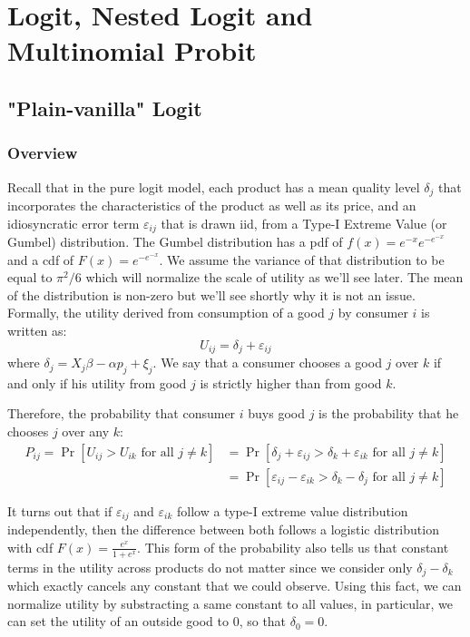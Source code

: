 \documentclass[12pt]{report}
\newcommand{\prob}[1]{\operatorname{Pr}\left[#1\right]}
\begin{document}
\chapter{Logit, Nested Logit and Multinomial Probit}

\section{"Plain-vanilla" Logit}

\subsection{Overview}

Recall that in the pure logit model, each product has a mean quality level $\delta_j$ that incorporates the characteristics of the product as well as its price, and an idiosyncratic error term $\varepsilon_{ij}$ that is drawn iid, from a Type-I Extreme Value (or Gumbel) distribution. The Gumbel distribution has a pdf of $f(x) = e^{-x}e^{-e^{-x}}$ and a cdf of $F(x) = e^{-e^{-x}}$. We assume the variance of that distribution to be equal to $\pi^2/6$ which will normalize the scale of utility as we'll see later. The mean of the distribution is non-zero but we'll see shortly why it is not an issue. Formally, the utility derived from consumption of a good $j$ by consumer $i$ is written as: $$ U_{ij} = \delta_j + \varepsilon_{ij} $$ where $\delta_j = X_j\beta - \alpha p_j + \xi_j$. We say that a consumer chooses a good $j$ over $k$ if and only if his utility from good $j$ is strictly higher than from good $k$.

Therefore, the probability that consumer $i$ buys good $j$ is the probability that he chooses $j$ over any $k$: \begin{align*} P_{ij} = \prob{U_{ij}>U_{ik}\text{ for all } j\neq k} & = \prob{\delta_j + \varepsilon_{ij} >\delta_k + \varepsilon_{ik}\text{ for all } j\neq k} \\
& = \prob{ \varepsilon_{ij} - \varepsilon_{ik} >\delta_k - \delta_j \text{ for all } j\neq k }
\end{align*} 

It turns out that if $\varepsilon_{ij}$ and $\varepsilon_{ik}$ follow a type-I extreme value distribution independently, then the difference between both follows a logistic distribution with cdf $F(x) = \frac{e^{x}}{1+e^{x}}$. This form of the probability also tells us that constant terms in the utility across products do not matter since we consider only $\delta_j - \delta_k$ which exactly cancels any constant that we could observe. Using this fact, we can normalize utility by substracting a same constant to all values, in particular, we can set the utility of an outside good to 0, so that $\delta_0 = 0$.
\end{document}

